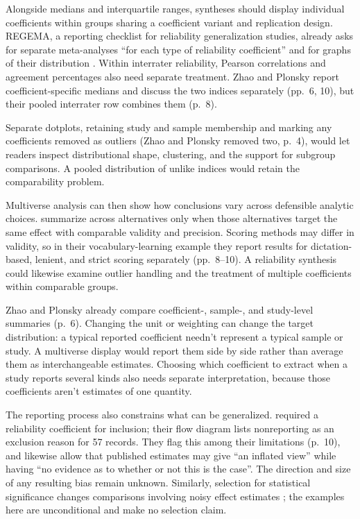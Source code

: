 \documentclass[12pt,twoside]{article}
\begin{document}
Alongside medians and interquartile ranges, syntheses should display individual coefficients within groups sharing a coefficient variant and replication design. REGEMA, a reporting checklist for reliability generalization studies, already asks for separate meta-analyses \enquote{for each type of reliability coefficient} and for graphs of their distribution \citep[items~8, 20]{SanchezMeca2021REGEMA}. Within interrater reliability, Pearson correlations and agreement percentages also need separate treatment. Zhao and Plonsky report coefficient-specific medians and discuss the two indices separately (pp.\ 6, 10), but their pooled interrater row combines them (p.\ 8).

Separate dotplots, retaining study and sample membership and marking any coefficients removed as outliers (Zhao and Plonsky removed two, p.\ 4), would let readers inspect distributional shape, clustering, and the support for subgroup comparisons. A pooled distribution of unlike indices would retain the comparability problem.

Multiverse analysis can then show how conclusions vary across defensible analytic choices. \textcite[p.\ 17]{MaieEguchiUchihara2024} summarize across alternatives only when those alternatives target the same effect with comparable validity and precision. Scoring methods may differ in validity, so in their vocabulary-learning example they report results for dictation-based, lenient, and strict scoring separately (pp.\ 8--10). A reliability synthesis could likewise examine outlier handling and the treatment of multiple coefficients within comparable groups.

Zhao and Plonsky already compare coefficient-, sample-, and study-level summaries (p.\ 6). Changing the unit or weighting can change the target distribution: a typical reported coefficient needn't represent a typical sample or study. A multiverse display would report them side by side rather than average them as interchangeable estimates. Choosing which coefficient to extract when a study reports several kinds also needs separate interpretation, because those coefficients aren't estimates of one quantity.

The reporting process also constrains what can be generalized. \textcite[pp.\ 3, 5]{ZhaoPlonsky2026} required a reliability coefficient for inclusion; their flow diagram lists nonreporting as an exclusion reason for 57 records. They flag this among their limitations (p.\ 10), and \textcite[p.\ 548]{PlonskyDerrick2016} likewise allow that published estimates may give \enquote{an inflated view} while having \enquote{no evidence as to whether or not this is the case}. The direction and size of any resulting bias remain unknown. Similarly, selection for statistical significance changes comparisons involving noisy effect estimates \citep{LokenGelman2017,Gelman2023MeasurementUpdate}; the examples here are unconditional and make no selection claim.
\end{document}
